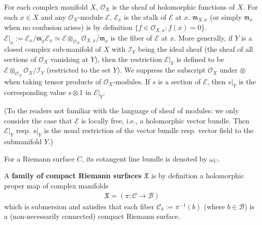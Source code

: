 \documentclass[12pt,a4paper,notitlepage]{article}
\theoremstyle{definition}
\theoremstyle{plain}
\newcommand{\fk}{\mathfrak}
\newcommand{\mc}{\mathcal}
\newcommand{\scr}{\mathscr}
\numberwithin{equation}{section}
\begin{document}
For each complex manifold $X$, $\scr O_X$ is the sheaf of holomorphic functions of $X$. For each $x\in X$ and any $\scr O_X$-module $\scr E$, $\scr E_x$ is the stalk of $\scr E$ at $x$. $\fk m_{X,x}$ (or simply $\fk m_x$ when no confusion arises)  is by definition $\{f\in\scr O_{X,x}:f(x)=0\}$. $\scr E|_x:=\scr E_x/\fk m_x\scr E_x\simeq\scr E\otimes_{\scr O_X}\scr O_{X,x}/\fk m_x$ is the fiber of $\scr E$ at $x$. More generally, if $Y$ is a closed complex sub-manifold of $X$ with $\scr I_Y$ being the ideal sheaf (the sheaf of all sections of $\scr O_X$ vanishing at $Y$), then the restriction $\scr E|_Y$ is defined to be $\scr E\otimes_{\scr O_X}\scr O_X/\scr I_Y$ (restricted to the set $Y$). We suppress the subscript $\scr O_X$ under $\otimes$ when taking tensor products of $\scr O_X$-modules. If $s$ is a section of $\scr E$, then $s|_Y$ is the corresponding value $s\otimes 1$ in $\scr E|_Y$. 


(To the readers not familiar with the language of sheaf of modules: we only consider the case that $\scr E$ is locally free, i.e., a holomorphic vector bundle. Then $\scr E|_Y$ resp. $s|_Y$ is the usual restriction of the vector bundle resp. vector field to the submanifold $Y$.)


For a Riemann surface $C$, its cotangent line bundle is denoted by $\omega_C$. \index{zz@$\omega_C$, $\omega_{\mc C_b}$}

A \textbf{family of compact Riemann surfaces} $\fk X$ is by definition a holomorphic proper  map of complex manifolds
\begin{align*}
\fk X=(\pi:\mc C\rightarrow\mc B)	
\end{align*}
which is submersion and satisfies that each fiber $\mc C_b:=\pi^{-1}(b)$ (where $b\in\mc B$) is a (non-necessarily connected) compact Riemann surface.  

\end{document}
